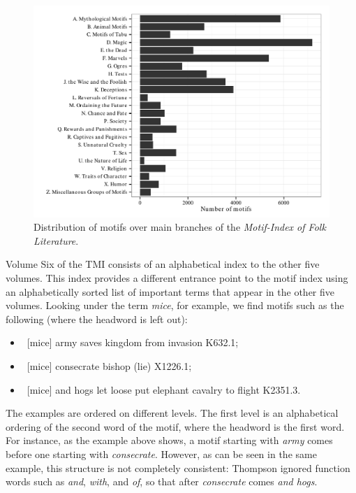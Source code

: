 \begin{figure}[t]
    \centering
    \includegraphics[width=\textwidth]{images/tmi-motif-distribution.pdf}
    \caption{Distribution of motifs over main branches of the \emph{Motif-Index of Folk Literature}.}
    \label{fig:tmi-motif-distribution}
\end{figure}

Volume Six of the TMI consists of an alphabetical index to the other five volumes. This index provides a different entrance point to the motif index using an alphabetically sorted list of important terms that appear in the other five volumes. Looking under the term \emph{mice}, for example, we find motifs such as the following (where the headword is left out):
\begin{itemize}
    \item~[mice] army saves kingdom from invasion K632.1;
    \item~[mice] consecrate bishop (lie) X1226.1;
    \item~[mice] and hogs let loose put elephant cavalry to flight K2351.3.
\end{itemize}
The examples are ordered on different levels. The first level is an alphabetical ordering of the second word of the motif, where the headword is the first word. For instance, as the example above shows, a motif starting with \emph{army} comes before one starting with \emph{consecrate}. However, as can be seen in the same example, this structure is not completely consistent: Thompson ignored function words such as \emph{and}, \emph{with}, and \emph{of}, so that after \emph{consecrate} comes \emph{and hogs}.

